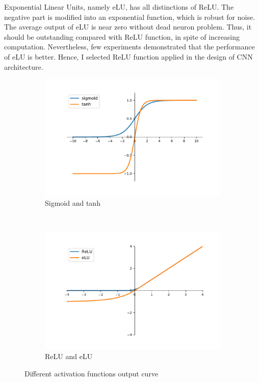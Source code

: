 \begin{itemize}[leftmargin=*]
	Exponential Linear Units, namely eLU, has all distinctions of ReLU. The negative part is modified into an exponential function, which is robust for noise. The average output of eLU is near zero without dead neuron problem. Thus, it should be outstanding compared with ReLU function, in spite of increasing computation. Nevertheless, few experiments demonstrated that the performance of eLU is better. Hence, I selected ReLU function applied in the design of CNN architecture.
\end{itemize}
\begin{figure}[!htp]
     \begin{subfigure}[b]{0.5\linewidth}
         \centering
		\includegraphics[scale=0.5]{Figs/chap3/act1.pdf}
		\caption{Sigmoid and tanh}
		\label{fig:sig}
     \end{subfigure}
     ~
     \begin{subfigure}[b]{0.5\linewidth}
         \centering
		\includegraphics[scale=0.5]{Figs/chap3/act2.pdf}
		\caption{ReLU and eLU}
		\label{fig:relu}
     \end{subfigure}
  \caption{Different activation functions output curve}
  \label{Fig:act}
\end{figure}
